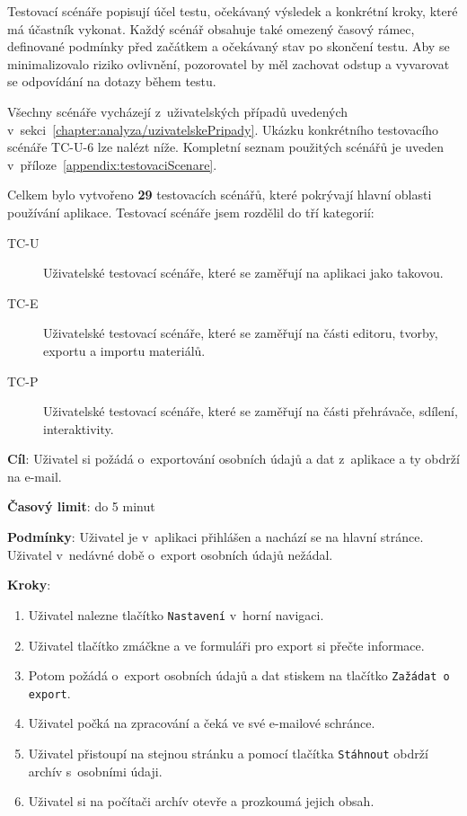 Testovací scénáře popisují účel testu, očekávaný výsledek a konkrétní kroky, které má účastník vykonat.
Každý scénář obsahuje také omezený časový rámec, definované podmínky před začátkem a očekávaný stav po skončení testu. 
Aby se minimalizovalo riziko ovlivnění, pozorovatel by měl zachovat odstup a vyvarovat se odpovídání na dotazy během testu.

Všechny scénáře vycházejí z~uživatelských případů uvedených v~sekci~\ref{chapter:analyza/uzivatelskePripady}.
Ukázku konkrétního testovacího scénáře TC-U-6 lze nalézt níže. 
Kompletní seznam použitých scénářů je uveden v~příloze~\ref{appendix:testovaciScenare}.

Celkem bylo vytvořeno \textbf{29} testovacích scénářů, které pokrývají hlavní oblasti používání aplikace.
Testovací scénáře jsem rozdělil do tří kategorií:

\begin{description}
    \item[TC-U] Uživatelské testovací scénáře, které se zaměřují na aplikaci jako takovou. 
    \item[TC-E] Uživatelské testovací scénáře, které se zaměřují na části editoru, tvorby, exportu a importu materiálů.
    \item[TC-P] Uživatelské testovací scénáře, které se zaměřují na části přehrávače, sdílení, interaktivity.
\end{description}


\vspace{1em}

\textbf{Cíl}: Uživatel si požádá o~exportování osobních údajů a dat z~aplikace a ty obdrží na e-mail.

\textbf{Časový limit}: do 5 minut

\textbf{Podmínky}: Uživatel je v~aplikaci přihlášen a nachází se na hlavní stránce. Uživatel v~nedávné době o~export osobních údajů nežádal.

\textbf{Kroky}:

\begin{enumerate}[leftmargin=1.4cm]
    \item Uživatel nalezne tlačítko \verb|Nastavení| v~horní navigaci.
    \item Uživatel tlačítko zmáčkne a ve formuláři pro export si přečte informace.
    \item Potom požádá o~export osobních údajů a dat stiskem na tlačítko \verb|Zažádat o export|.
    \item Uživatel počká na zpracování a čeká ve své e-mailové schránce.
    \item Uživatel přistoupí na stejnou stránku a pomocí tlačítka \verb|Stáhnout| obdrží archív s~osobními údaji.
    \item Uživatel si na počítači archív otevře a prozkoumá jejich obsah.
\end{enumerate}

